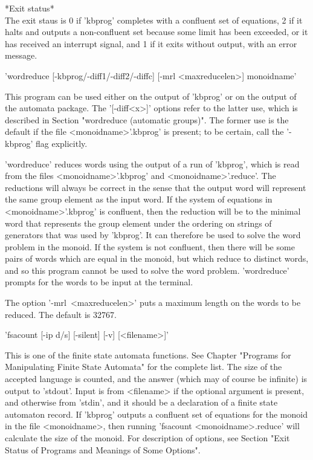 *Exit status*\\
The exit staus is 0 if 'kbprog' completes with a confluent set of equations,
2 if it halts and outputs a non-confluent set because some limit has
been exceeded, or it has received an interrupt signal, and 1 if it exits
without output, with an error message.

'wordreduce  [-kbprog/-diff1/-diff2/-diffc] [-mrl <maxreducelen>] monoidname' 

This program can be used either on the output of 'kbprog' or on the output
of the automata package. The '[-diff<x>]' options refer to the latter use,
which is described in Section
"wordreduce (automatic groups)".
The former use is the default if
the file <monoidname>'.kbprog' is present; to be certain, call the
'-kbprog' flag explicitly.

'wordreduce' reduces words using the output of a run of 'kbprog', which is
read from the files <monoidname>'.kbprog' and <monoidname>'.reduce'.
The reductions will always be
correct in the sense that the output word will represent the same group
element as the input word. If the system of equations in <monoidname>'.kbprog'
is confluent, then the reduction will be to the minimal word that represents
the group element under the ordering on strings of generators that was used
by 'kbprog'. It can therefore be used to solve the word problem in the
monoid. If the system is not confluent, then there will be some pairs of words 
which are equal in the monoid, but which reduce to distinct words, and
so this program cannot be used to solve the word problem.
'wordreduce' prompts for the words to be input at the terminal.

The option '-mrl\ <maxreducelen>' puts a maximum length on the words to
be reduced. The default is 32767.


'fsacount  [-ip d/s] [-silent] [-v] [<filename>]'

This is one of the finite state automata functions. See Chapter 
"Programs for Manipulating Finite State Automata" for the complete list.
The size of the accepted language is counted, and the answer (which may
of course be infinite) is output to 'stdout'. Input is from <filename> if
the optional argument is present, and otherwise from 'stdin', and it
should be a declaration of a finite state automaton record.
If 'kbprog' outputs a confluent set of equations for the monoid in the file
<monoidname>, then running 'fsacount <monoidname>.reduce'
will calculate the size of the monoid.
For description of options, see Section
"Exit Status of Programs and Meanings of Some Options".

